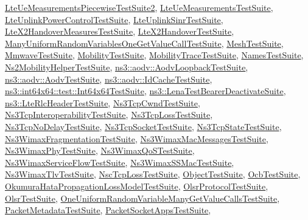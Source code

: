 \hyperlink{classLteUeMeasurementsPiecewiseTestSuite2}{Lte\+Ue\+Measurements\+Piecewise\+Test\+Suite2}, \hyperlink{classLteUeMeasurementsTestSuite}{Lte\+Ue\+Measurements\+Test\+Suite}, \hyperlink{classLteUplinkPowerControlTestSuite}{Lte\+Uplink\+Power\+Control\+Test\+Suite}, \hyperlink{classLteUplinkSinrTestSuite}{Lte\+Uplink\+Sinr\+Test\+Suite}, \hyperlink{classLteX2HandoverMeasuresTestSuite}{Lte\+X2\+Handover\+Measures\+Test\+Suite}, \hyperlink{classLteX2HandoverTestSuite}{Lte\+X2\+Handover\+Test\+Suite}, \hyperlink{classManyUniformRandomVariablesOneGetValueCallTestSuite}{Many\+Uniform\+Random\+Variables\+One\+Get\+Value\+Call\+Test\+Suite}, \hyperlink{classMeshTestSuite}{Mesh\+Test\+Suite}, \hyperlink{classMmwaveTestSuite}{Mmwave\+Test\+Suite}, \hyperlink{classMobilityTestSuite}{Mobility\+Test\+Suite}, \hyperlink{classMobilityTraceTestSuite}{Mobility\+Trace\+Test\+Suite}, \hyperlink{classNamesTestSuite}{Names\+Test\+Suite}, \hyperlink{classNs2MobilityHelperTestSuite}{Ns2\+Mobility\+Helper\+Test\+Suite}, \hyperlink{classns3_1_1aodv_1_1AodvLoopbackTestSuite}{ns3\+::aodv\+::\+Aodv\+Loopback\+Test\+Suite}, \hyperlink{classns3_1_1aodv_1_1AodvTestSuite}{ns3\+::aodv\+::\+Aodv\+Test\+Suite}, \hyperlink{classns3_1_1aodv_1_1IdCacheTestSuite}{ns3\+::aodv\+::\+Id\+Cache\+Test\+Suite}, \hyperlink{classns3_1_1int64x64_1_1test_1_1Int64x64TestSuite}{ns3\+::int64x64\+::test\+::\+Int64x64\+Test\+Suite}, \hyperlink{classns3_1_1LenaTestBearerDeactivateSuite}{ns3\+::\+Lena\+Test\+Bearer\+Deactivate\+Suite}, \hyperlink{classns3_1_1LteRlcHeaderTestSuite}{ns3\+::\+Lte\+Rlc\+Header\+Test\+Suite}, \hyperlink{classNs3TcpCwndTestSuite}{Ns3\+Tcp\+Cwnd\+Test\+Suite}, \hyperlink{classNs3TcpInteroperabilityTestSuite}{Ns3\+Tcp\+Interoperability\+Test\+Suite}, \hyperlink{classNs3TcpLossTestSuite}{Ns3\+Tcp\+Loss\+Test\+Suite}, \hyperlink{classNs3TcpNoDelayTestSuite}{Ns3\+Tcp\+No\+Delay\+Test\+Suite}, \hyperlink{classNs3TcpSocketTestSuite}{Ns3\+Tcp\+Socket\+Test\+Suite}, \hyperlink{classNs3TcpStateTestSuite}{Ns3\+Tcp\+State\+Test\+Suite}, \hyperlink{classNs3WimaxFragmentationTestSuite}{Ns3\+Wimax\+Fragmentation\+Test\+Suite}, \hyperlink{classNs3WimaxMacMessagesTestSuite}{Ns3\+Wimax\+Mac\+Messages\+Test\+Suite}, \hyperlink{classNs3WimaxPhyTestSuite}{Ns3\+Wimax\+Phy\+Test\+Suite}, \hyperlink{classNs3WimaxQoSTestSuite}{Ns3\+Wimax\+Qo\+S\+Test\+Suite}, \hyperlink{classNs3WimaxServiceFlowTestSuite}{Ns3\+Wimax\+Service\+Flow\+Test\+Suite}, \hyperlink{classNs3WimaxSSMacTestSuite}{Ns3\+Wimax\+S\+S\+Mac\+Test\+Suite}, \hyperlink{classNs3WimaxTlvTestSuite}{Ns3\+Wimax\+Tlv\+Test\+Suite}, \hyperlink{classNscTcpLossTestSuite}{Nsc\+Tcp\+Loss\+Test\+Suite}, \hyperlink{classObjectTestSuite}{Object\+Test\+Suite}, \hyperlink{classOcbTestSuite}{Ocb\+Test\+Suite}, \hyperlink{classOkumuraHataPropagationLossModelTestSuite}{Okumura\+Hata\+Propagation\+Loss\+Model\+Test\+Suite}, \hyperlink{classOlsrProtocolTestSuite}{Olsr\+Protocol\+Test\+Suite}, \hyperlink{classOlsrTestSuite}{Olsr\+Test\+Suite}, \hyperlink{classOneUniformRandomVariableManyGetValueCallsTestSuite}{One\+Uniform\+Random\+Variable\+Many\+Get\+Value\+Calls\+Test\+Suite}, \hyperlink{classPacketMetadataTestSuite}{Packet\+Metadata\+Test\+Suite}, \hyperlink{classPacketSocketAppsTestSuite}{Packet\+Socket\+Apps\+Test\+Suite}, 